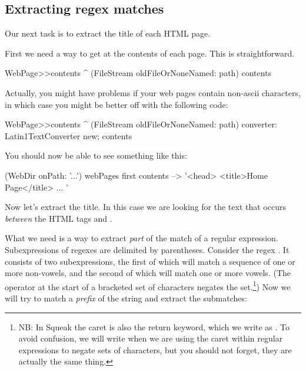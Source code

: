 \documentclass[a4paper,10pt,twoside]{book}
\begin{document}
\subsection{Extracting regex matches}

Our next task is to extract the title of each HTML page.

First we need a way to get at the contents of each page. This is straightforward.


\begin{code}{}
WebPage>>contents
	^ (FileStream oldFileOrNoneNamed: path) contents
\end{code}

Actually, you might have problems if your web pages contain non-ascii characters, in which case you might be better off with the following code:

\begin{code}{}
WebPage>>contents
	^ (FileStream oldFileOrNoneNamed: path)
		converter: Latin1TextConverter new;
		contents
\end{code}

You should now be able to see something like this:

\begin{code}{}
(WebDir onPath: '...') webPages first contents --> '<head>
<title>Home Page</title>
...
'
\end{code}

Now let's extract the title. In this case we are looking for the text that occurs \emph{between} the HTML tags  and . 

What we need is a way to extract \emph{part} of the match of a regular expression. Subexpressions of regexes are delimited by parentheses.  Consider the regex \ct{([CARETaeiou]+)([aeiou]+)}. It consists of two subexpressions, the first of which will match a sequence of one or more non-vowels, and the second of which will match one or more vowels. (The operator  at the start of a bracketed set of characters negates the set.\footnote{NB: In Squeak the caret is also the return keyword, which we write as \ct{^}. To avoid confusion, we will write  when we are using the caret within regular expressions to negate sets of characters, but you should not forget, they are actually the same thing.}) Now we will try to match a \emph{prefix} of the string  and extract the submatches:
\end{document}

